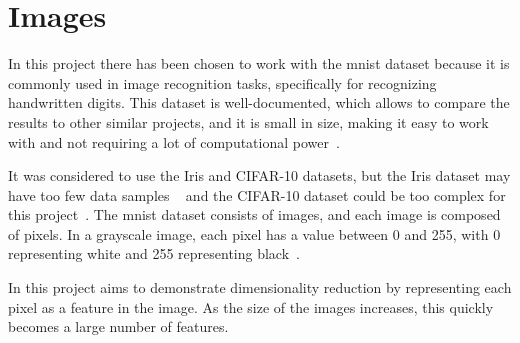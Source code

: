 \section{Images}\label{sec:images}


In this project there has been chosen to work with the \gls{mnist} dataset because it is commonly used in image recognition tasks, specifically for recognizing handwritten digits. This dataset is well-documented, which allows to compare the results to other similar projects, and it is small in size, making it easy to work with and not requiring a lot of computational power~\cite{lecun-mnist-database}.

It was considered to use the Iris and CIFAR-10 datasets, but the Iris dataset may have too few data samples ~\cite{mnist-vs-iris} and the CIFAR-10 dataset could be too complex for this project~\cite{datasets-uniqtech}. The \gls{mnist} dataset consists of images, and each image is composed of pixels. In a grayscale image, each pixel has a value between 0 and 255, with 0 representing white and 255 representing black~\cite{lecun-mnist-database}.

In this project aims to demonstrate dimensionality reduction by representing each pixel as a feature in the image. As the size of the images increases, this quickly becomes a large number of features.